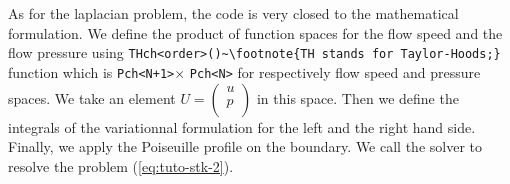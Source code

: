 As for the laplacian problem, the code is very closed to the mathematical formulation.
We define the product of function spaces for the flow speed and the flow pressure
using \lstinline!THch<order>()~\footnote{TH stands for Taylor-Hoods;}! function which is \lstinline!Pch<N+1>!$\times$ \lstinline!Pch<N>!
for respectively flow speed and pressure spaces.
We take an element 
$U=\left(
    \begin{array}{c}
        u \\
        p \\
    \end{array}
\right)
$
in this space. Then we define the integrals of the variationnal formulation
for the left and the right hand side. Finally, we apply the Poiseuille profile on the boundary.
We call the solver to resolve the problem (\ref{eq:tuto-stk-2}).



